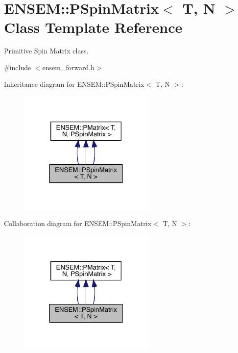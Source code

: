 \hypertarget{classENSEM_1_1PSpinMatrix}{}\section{E\+N\+S\+EM\+:\+:P\+Spin\+Matrix$<$ T, N $>$ Class Template Reference}
\label{classENSEM_1_1PSpinMatrix}


Primitive Spin Matrix class.  




{\ttfamily \#include $<$ensem\+\_\+forward.\+h$>$}



Inheritance diagram for E\+N\+S\+EM\+:\+:P\+Spin\+Matrix$<$ T, N $>$\+:
\nopagebreak
\begin{figure}[H]
\begin{center}
\leavevmode
\includegraphics[width=191pt]{db/de9/classENSEM_1_1PSpinMatrix__inherit__graph}
\end{center}
\end{figure}


Collaboration diagram for E\+N\+S\+EM\+:\+:P\+Spin\+Matrix$<$ T, N $>$\+:
\nopagebreak
\begin{figure}[H]
\begin{center}
\leavevmode
\includegraphics[width=191pt]{d2/d1d/classENSEM_1_1PSpinMatrix__coll__graph}
\end{center}
\end{figure}
